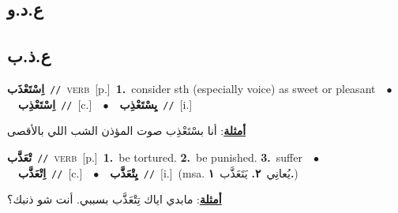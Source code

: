\documentclass[10pt,a4paper,twoside]{article} %
\begin{document}
\begin{multicols}{2}
\vspace{-3mm}
\subsection*{\color{blue}\foreignlanguage{arabic}{ع.د.و}\color{blue}{ (ntws)}} 

\vspace{-3mm}
\subsection*{\color{blue}\foreignlanguage{arabic}{ع.ذ.ب}\color{blue}{}} 

{\setlength\topsep{0pt}\textbf{\foreignlanguage{arabic}{اِسْتَعْذَب}}\ {\color{gray}\texttt{//}\color{black}}\ \textsc{verb}\ [p.]\ \textbf{1.}~consider sth (especially voice) as sweet or pleasant\ \ $\bullet$\ \ \setlength\topsep{0pt}\textbf{\foreignlanguage{arabic}{اِسْتَعْذِب}}\ {\color{gray}\texttt{//}\color{black}}\ [c.]\ \ $\bullet$\ \ \setlength\topsep{0pt}\textbf{\foreignlanguage{arabic}{يِسْتَعْذِب}}\ {\color{gray}\texttt{//}\color{black}}\ [i.]\  \begin{flushright}\color{gray}\foreignlanguage{arabic}{\textbf{\underline{\foreignlanguage{arabic}{أمثلة}}}: أنا بسْتَعْذِب صوت المؤذن الشب اللي بالأقصى}\end{flushright}\color{black}} \vspace{2mm}

{\setlength\topsep{0pt}\textbf{\foreignlanguage{arabic}{تْعَذَّب}}\ {\color{gray}\texttt{//}\color{black}}\ \textsc{verb}\ [p.]\ \textbf{1.}~be tortured.  \textbf{2.}~be punished.  \textbf{3.}~suffer\ \ $\bullet$\ \ \setlength\topsep{0pt}\textbf{\foreignlanguage{arabic}{اِتْعَذَّب}}\ {\color{gray}\texttt{//}\color{black}}\ [c.]\ \ $\bullet$\ \ \setlength\topsep{0pt}\textbf{\foreignlanguage{arabic}{يِتْعَذَّب}}\ {\color{gray}\texttt{//}\color{black}}\ [i.]\ \color{gray}(msa. \foreignlanguage{arabic}{يُعانِي}~\foreignlanguage{arabic}{\textbf{٢.}}  \foreignlanguage{arabic}{يَتَعَذَّب}~\foreignlanguage{arabic}{\textbf{١.}})\color{black}\  \begin{flushright}\color{gray}\foreignlanguage{arabic}{\textbf{\underline{\foreignlanguage{arabic}{أمثلة}}}: مابدي اياك تِتْعَذَّب بسببي. أنت شو ذنبك؟}\end{flushright}\color{black}} \vspace{2mm}


\end{multicols}
\end{document}
